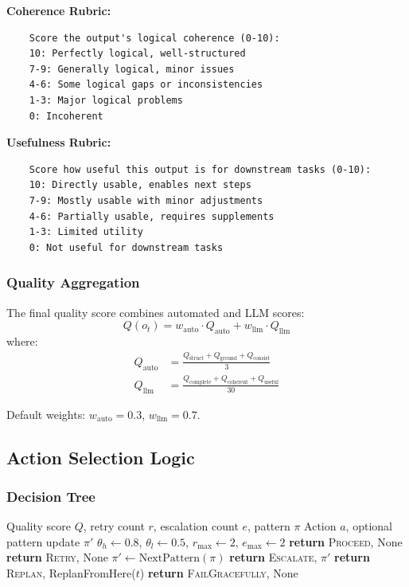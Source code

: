 \documentclass{article}
\theoremstyle{plain}
\theoremstyle{definition}
\theoremstyle{remark}
\begin{document}
\textbf{Coherence Rubric:}
\begin{verbatim}
	Score the output's logical coherence (0-10):
	10: Perfectly logical, well-structured
	7-9: Generally logical, minor issues
	4-6: Some logical gaps or inconsistencies
	1-3: Major logical problems
	0: Incoherent
\end{verbatim}

\textbf{Usefulness Rubric:}
\begin{verbatim}
	Score how useful this output is for downstream tasks (0-10):
	10: Directly usable, enables next steps
	7-9: Mostly usable with minor adjustments
	4-6: Partially usable, requires supplements
	1-3: Limited utility
	0: Not useful for downstream tasks
\end{verbatim}

\subsubsection{Quality Aggregation}

The final quality score combines automated and LLM scores:
\begin{equation}
	Q(o_t) = w_{\text{auto}} \cdot Q_{\text{auto}} + w_{\text{llm}} \cdot Q_{\text{llm}}
\end{equation}
where:
\begin{align}
	Q_{\text{auto}} &= \frac{Q_{\text{struct}} + Q_{\text{ground}} + Q_{\text{consist}}}{3} \\
	Q_{\text{llm}} &= \frac{Q_{\text{complete}} + Q_{\text{coherent}} + Q_{\text{useful}}}{30}
\end{align}

Default weights: $w_{\text{auto}} = 0.3$, $w_{\text{llm}} = 0.7$.

\subsection{Action Selection Logic}
\label{sec:rcm_actions}

\subsubsection{Decision Tree}

\begin{algorithm}[H]
	\caption{RCM Action Selection}
	\begin{algorithmic}[1]
		\REQUIRE Quality score $Q$, retry count $r$, escalation count $e$, pattern $\pi$
		\ENSURE Action $a$, optional pattern update $\pi'$
		\STATE $\theta_h \leftarrow 0.8$, $\theta_l \leftarrow 0.5$, $r_{\max} \leftarrow 2$, $e_{\max} \leftarrow 2$
		\STATE \textbf{return} \textsc{Proceed}, None
		\STATE \textbf{return} \textsc{Retry}, None
		\STATE $\pi' \leftarrow \text{NextPattern}(\pi)$
		\STATE \textbf{return} \textsc{Escalate}, $\pi'$
		\STATE \textbf{return} \textsc{Replan}, ReplanFromHere($t$)
		\ELSE
		\STATE \textbf{return} \textsc{FailGracefully}, None
		\ENDIF
	\end{algorithmic}
\end{algorithm}
\end{document}
